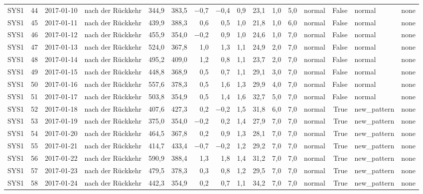 \begin{tabular}{lrllrrrrrrrrlrll}
SYS1 & 44 & 2017-01-10 & nach der Rückkehr & 344,9 & 383,5 & $-$0,7 & $-$0,4 & 0,9 & 23,1 & 1,0 & 5,0 & normal & False & normal & none \\
SYS1 & 45 & 2017-01-11 & nach der Rückkehr & 439,9 & 388,3 & 0,6 & 0,5 & 1,0 & 21,8 & 1,0 & 6,0 & normal & False & normal & none \\
SYS1 & 46 & 2017-01-12 & nach der Rückkehr & 455,9 & 354,0 & $-$0,2 & 0,9 & 1,0 & 24,6 & 1,0 & 7,0 & normal & False & normal & none \\
SYS1 & 47 & 2017-01-13 & nach der Rückkehr & 524,0 & 367,8 & 1,0 & 1,3 & 1,1 & 24,9 & 2,0 & 7,0 & normal & False & normal & none \\
SYS1 & 48 & 2017-01-14 & nach der Rückkehr & 495,2 & 409,0 & 1,2 & 0,8 & 1,1 & 23,7 & 2,0 & 7,0 & normal & False & normal & none \\
SYS1 & 49 & 2017-01-15 & nach der Rückkehr & 448,8 & 368,9 & 0,5 & 0,7 & 1,1 & 29,1 & 3,0 & 7,0 & normal & False & normal & none \\
SYS1 & 50 & 2017-01-16 & nach der Rückkehr & 557,6 & 378,3 & 0,5 & 1,6 & 1,3 & 29,9 & 4,0 & 7,0 & normal & False & normal & none \\
SYS1 & 51 & 2017-01-17 & nach der Rückkehr & 503,8 & 354,9 & 0,5 & 1,4 & 1,6 & 32,7 & 5,0 & 7,0 & normal & False & normal & none \\
SYS1 & 52 & 2017-01-18 & nach der Rückkehr & 407,6 & 427,3 & 0,2 & $-$0,2 & 1,5 & 31,8 & 6,0 & 7,0 & normal & True & new\_pattern & none \\
SYS1 & 53 & 2017-01-19 & nach der Rückkehr & 375,0 & 354,0 & $-$0,2 & 0,2 & 1,4 & 27,9 & 7,0 & 7,0 & normal & True & new\_pattern & none \\
SYS1 & 54 & 2017-01-20 & nach der Rückkehr & 464,5 & 367,8 & 0,2 & 0,9 & 1,3 & 28,1 & 7,0 & 7,0 & normal & True & new\_pattern & none \\
SYS1 & 55 & 2017-01-21 & nach der Rückkehr & 414,7 & 433,4 & $-$0,7 & $-$0,2 & 1,2 & 29,2 & 7,0 & 7,0 & normal & True & new\_pattern & none \\
SYS1 & 56 & 2017-01-22 & nach der Rückkehr & 590,9 & 388,4 & 1,3 & 1,8 & 1,4 & 31,2 & 7,0 & 7,0 & normal & True & new\_pattern & none \\
SYS1 & 57 & 2017-01-23 & nach der Rückkehr & 479,5 & 378,3 & 0,3 & 0,8 & 1,2 & 29,5 & 7,0 & 7,0 & normal & True & new\_pattern & none \\
SYS1 & 58 & 2017-01-24 & nach der Rückkehr & 442,3 & 354,9 & 0,2 & 0,7 & 1,1 & 34,2 & 7,0 & 7,0 & normal & True & new\_pattern & none \\

\end{tabular}
